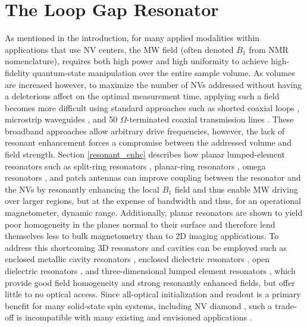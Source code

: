 
\chapter{The Loop Gap Resonator}

As mentioned in the introduction, for many applied modalities within applications that use NV centers, the MW field (often denoted $B_1$ from NMR nomenclature), requires both high power and high uniformity to achieve high-fidelity quantum-state manipulation over the entire sample volume. As volumes are increased however, to maximize the number of NVs addressed without having a deleterious affect on the optimal measurement time, applying such a field becomes more difficult using standard approaches such as shorted coaxial loops \cite{clevenson2015broadband,chipaux2015magnetic}, microstrip waveguides \cite{andrich2017long,horowitz2012electron}, and 50 $\Omega$-terminated coaxial transmission lines \cite{li2010design,mrozek2015circularly,zhang2016microwave,zhang2018vector}. These broadband approaches allow arbitrary drive frequencies, however, the lack of resonant enhancement forces a compromise between the addressed volume and field strength. Section \ref{resonant_enhc} describes how planar lumped-element resonators such as split-ring resonators \cite{bayat2014efficient}, planar-ring resonators \cite{zhang2016microwave,sasaki2016broadband}, omega resonators \cite{twig2013ultra,horsley2018microwave,simpson2017electron}, and patch antennas \cite{zhang2016microwave} can improve coupling between the resonator and the NVs by resonantly enhancing the local $B_1$ field and thus enable MW driving over larger regions, but at the expense of bandwidth and thus, for an operational magnetometer, dynamic range. Additionally, planar resonators are shown to yield poor homogeneity in the planes normal to their surface and therefore lend themselves less to bulk magnetometry than to 2D imaging applications. To address this shortcoming 3D resonators and cavities can be employed such as enclosed metallic cavity resonators \cite{rose2017coherent}, enclosed dielectric resonators \cite{breeze2017continuous,floch2016towards,creedon2015strong}, open dielectric resonators \cite{kapitanova2017dielectric}, and three-dimensional lumped element resonators \cite{angerer2016collective}, which provide good field homogeneity and strong resonantly enhanced fields, but offer little to no optical access. Since all-optical initialization and readout is a primary benefit for many solid-state spin systems, including NV diamond \cite{doherty2013nitrogen}, such a trade-off is incompatible with many existing and envisioned applications \cite{schirhagl2014nitrogen}. 


